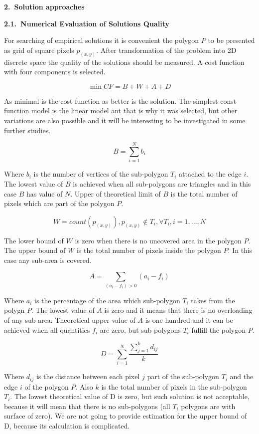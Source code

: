 \documentclass[11pt,leqno]{book}
\newcommand{\sect}[1]{\vskip7mm\par{\large \bf #1}}
\newcommand{\subsect}[1]{\vskip 3mm\par{\bf#1}}
\begin{document}
\sect{2.~Solution approaches}

\subsect{2.1.~Numerical Evaluation of Solutions Quality}

For searching of empirical solutions it is convenient the polygon $P$ to be presented as grid of square pixels $p_{(x,y)}$. After transformation of the problem into 2D discrete space the quality of the solutions should be measured. A cost function with four components is selected. 

$$\min CF = B + W + A + D$$

As minimal is the cost function as better is the solution. The simplest const function model is the linear model ant that is why it was selected, but other variations are also possible and it will be interesting to be investigated in some further studies. 

$$B = \sum_{i=1}^N b_i$$

Where $b_i$ is the number of vertices of the sub-polygon $T_i$ attached to the edge $i$. The lowest value of $B$ is achieved when all sub-polygons are triangles and in this case $B$ has value of $N$. Upper of theoretical limit of $B$ is the total number of pixels which are part of the polygon $P$.

$$W= count( p_{(x,y)} ), p_{(x,y)} \notin T_i, \forall{ T_i}, i=1, \dots, N$$

The lower bound of $W$ is zero when there is no uncovered area in the polygon $P$. The upper bound of $W$ is the total number of pixels inside the polygon $P$. In this case any sub-area is covered. 

$$A = \sum_{(a_i - f_i)>0}(a_i - f_i)$$

Where $a_i$ is the percentage of the area which sub-polygon $T_i$ takes from the polygn $P$. The lowest value of $A$ is zero and it means that there is no overloading of any sub-area. Theoretical upper value of $A$ is one hundred and it can be achieved when all quantities $f_i$ are zero, but sub-polygons $T_i$ fulfill the polygon $P$.

$$D = \sum_{i=1}^N \frac{\sum_{j=1}^k d_{ij}}k$$

Where $d_{ij}$ is the distance between each pixel $j$ part of the sub-polygon $T_i$ and the edge $i$ of the polygon $P$. Also $k$ is the total number of pixels in the sub-polygon $T_i$. The lowest theoretical value of D is zero, but such solution is not acceptable, because it will mean that there is no sub-polygons (all $T_i$ polygons are with surface of zero). We are not going to provide estimation for the upper bound of D, because its calculation is complicated. 
\end{document}
